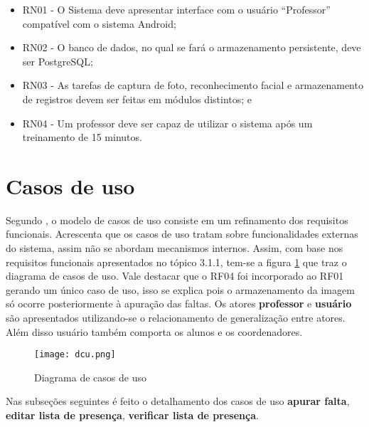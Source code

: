 \begin{itemize}

\item RN01 - O Sistema deve apresentar interface com o usuário “Professor” compatível com o  sistema Android; 

\item RN02 - O banco de dados, no qual se fará o armazenamento persistente, deve ser PostgreSQL;

\item RN03 - As tarefas de captura de foto, reconhecimento facial e armazenamento de registros devem ser feitas em módulos distintos; e

\item RN04 - Um professor deve ser capaz de utilizar o sistema após um treinamento de 15 minutos.

\end{itemize}


\section{Casos de uso}
\noindent
Segundo \citep{bezerra}, o modelo de casos de uso  consiste em um refinamento dos requisitos funcionais. Acrescenta que os casos de uso tratam sobre funcionalidades externas do sistema, assim não se abordam mecanismos internos. Assim, com base nos requisitos funcionais apresentados no tópico 3.1.1, tem-se a figura \ref{fig:figura03} que traz o diagrama de casos de uso. Vale destacar que o RF04 foi incorporado ao RF01 gerando um único caso de uso, isso se explica pois o armazenamento da imagem só ocorre posteriormente à apuração das faltas. Os atores \textbf{professor} e \textbf{usuário} são apresentados utilizando-se  o relacionamento de generalização entre atores. Além disso usuário também comporta os alunos e os coordenadores. 

\begin{figure}[!ht]
	\centering
	\texttt{[image: dcu.png]}   
	\caption{Diagrama de casos de uso}
	\label{fig:figura03}
\end{figure}
Nas subseções seguintes é feito o detalhamento dos casos de uso \textbf{apurar falta}, \textbf{editar lista de presença}, \textbf{verificar lista de presença}.


